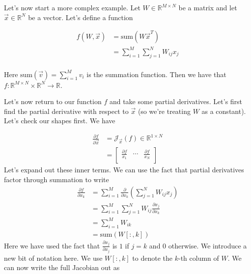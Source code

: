 \documentclass[book.tex]{subfiles}
\begin{document}
Let's now start a more complex example. Let $W \in \mathbb{R}^{M \times N}$ be a matrix and let $\vec{x} \in \mathbb{R}^N$ be a vector. Let's define a function

\begin{align}
    f(W, \vec{x}) &= \textrm{sum}(W \vec{x}^T) \\
    &= \sum_{i=1}^M \sum_{j=1}^N W_{ij} x_j \\
\end{align}  

Here $\textrm{sum}(\vec{v}) = \sum_{i=1}^M v_i$ is the summation function. Then we have that $f: \mathbb{R}^{M \times N} \times \mathbb{R}^N \to \mathbb{R}$. %

Let's now return to our function $f$ and take some partial derivatives. Let's first find the partial derivative with respect to $\vec{x}$ (so we're treating $W$ as a constant). Let's check our shapes first. We have

\begin{align}
\frac{\partial f}{\partial \vec{x}} &= \mathcal{J}_{\vec{x}}(f) \in \mathbb{R}^{1 \times N} \\
&= \begin{bmatrix}
\frac{\partial f}{x_1} & \cdots & \frac{\partial f}{x_N} \\
\end{bmatrix} 
\end{align}
Let's expand out these inner terms. We can use the fact that partial derivatives factor through summation to write
\begin{align}
    \frac{\partial f}{\partial x_k} &= \sum_{i=1}^M \frac{\partial}{\partial x_k} \left ( \sum_{j=1}^N W_{ij} x_j \right ) \\
    &= \sum_{i=1}^M  \sum_{j=1}^N W_{ij} \frac{\partial x_j }{\partial x_k}  \\
    &= \sum_{i=1}^M  W_{ik}  \\
    &= \textrm{sum}(W[:, k]) 
\end{align}
Here we have used the fact that $\frac{\partial x_j}{\partial x_j}$ is $1$ if $j = k$ and $0$ otherwise. We introduce a new bit of notation here. We use $W[:, k]$ to denote the $k$-th column of $W$. We can now write the full Jacobian out as 
\end{document}
